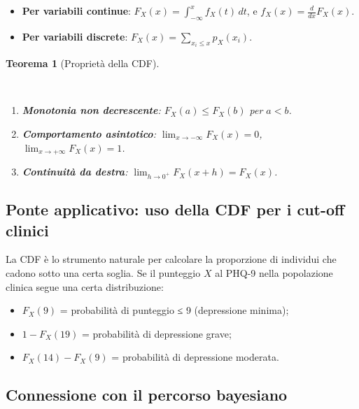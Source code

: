 \documentclass[
  italian,
  letterpaper,
  a4paper,
  11pt,
  open=any]{scrbook}
\providecommand{\tightlist}{%
  \setlength{\itemsep}{0pt}\setlength{\parskip}{0pt}}
\theoremstyle{plain}
\newtheorem{theorem}{Teorema}[chapter]
\theoremstyle{definition}
\theoremstyle{definition}
\theoremstyle{remark}
\begin{document}
\begin{itemize}
\tightlist
\item
  \textbf{Per variabili continue}:
  \(F_X(x) = \int_{-\infty}^{x} f_X(t)\,dt\), e
  \(f_X(x) = \frac{d}{dx} F_X(x)\).
\item
  \textbf{Per variabili discrete}:
  \(F_X(x) = \sum_{x_i \leq x} p_X(x_i)\).
\end{itemize}

\begin{theorem}[Proprietà della
CDF]\protect\hypertarget{thm-cdf-properties}{}\label{thm-cdf-properties}

~

\begin{enumerate}
\def\labelenumi{\arabic{enumi}.}
\tightlist
\item
  \textbf{Monotonia non decrescente}: \(F_X(a) \leq F_X(b)\) per
  \(a < b\).
\item
  \textbf{Comportamento asintotico}:
  \(\lim_{x \to -\infty} F_X(x) = 0\),
  \(\lim_{x \to +\infty} F_X(x) = 1\).
\item
  \textbf{Continuità da destra}:
  \(\lim_{h \to 0^+} F_X(x + h) = F_X(x)\).
\end{enumerate}

\end{theorem}

\subsection{Ponte applicativo: uso della CDF per i cut-off
clinici}\label{ponte-applicativo-uso-della-cdf-per-i-cut-off-clinici}

La CDF è lo strumento naturale per calcolare la proporzione di individui
che cadono sotto una certa soglia. Se il punteggio \(X\) al PHQ-9 nella
popolazione clinica segue una certa distribuzione:

\begin{itemize}
\tightlist
\item
  \(F_X(9)\) = probabilità di punteggio ≤ 9 (depressione minima);
\item
  \(1 - F_X(19)\) = probabilità di depressione grave;
\item
  \(F_X(14) - F_X(9)\) = probabilità di depressione moderata.
\end{itemize}

\subsection{Connessione con il percorso
bayesiano}\label{connessione-con-il-percorso-bayesiano-1}
\end{document}
